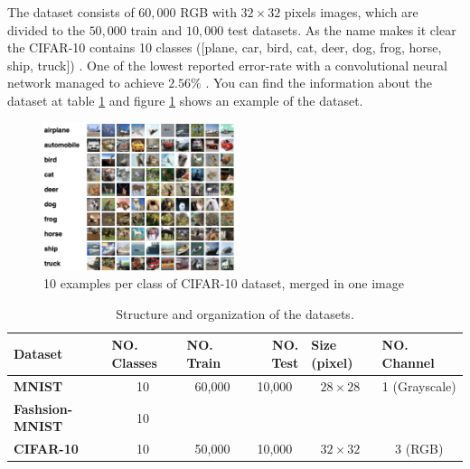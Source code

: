 The dataset consists of $60,000$  RGB with $32 \times 32$ pixels images, which are divided to the $50,000$ train and $10,000$ test datasets. As the name makes it clear the CIFAR-10 contains 10 classes ([plane, car, bird, cat, deer, dog, frog, horse, ship, truck]) \cite{CIFAR-10_dataset_reference}.
One of the lowest reported error-rate with a convolutional neural network managed to achieve $2.56\%$ \cite{CIFAR-10_best_result_reference}.  You can
find the information about the dataset at table
\ref{dataset_table} and figure \ref{fig:cifar-10_dataset_example} shows an example of the dataset.

\begin{figure}
  \centering
  \label{fig:cifar-10_dataset_example}
  \includegraphics[width=0.5\textwidth]{fig/cifar-10}
  \caption{10 examples per class of CIFAR-10 dataset, merged in one image \cite{CIFAR-10_dataset_reference}}
\end{figure}




\begin{table}[]
  \label{dataset_table}
  \begin{tabular}{
      l |
      c
      c
      c
      c
      c}
    \hline
    {\textbf{Dataset}}        & \multicolumn{1}{l}{{\textbf{NO. Classes}}} & \multicolumn{1}{l}{{\textbf{NO. Train}}} & \multicolumn{1}{r}{{\textbf{NO. Test}}} & \multicolumn{1}{l}{{\textbf{Size (pixel)}}} & \multicolumn{1}{l}{{\textbf{NO. Channel}}} \\ \hline
    {\textbf{MNIST}}          & 10                                         & 60,000                                   & 10,000                                  & $28\times28$                                & 1 (Grayscale)                              \\
    {\textbf{Fashsion-MNIST}} & 10                                         &                                          &                                         &                                             &                                            \\
    {\textbf{CIFAR-10}}       & 10                                         & 50,000
    & 10,000                                  & $32\times32$                                & 3
    (RGB)                                         \\ \hline
  \end{tabular}
  \caption{Structure and organization of the datasets.}
\end{table}


